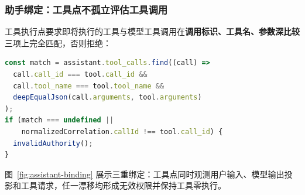 \subsubsection{助手绑定：工具点不孤立评估工具调用}

工具执行点要求即将执行的工具与模型工具调用在\textbf{调用标识、工具名、参数深比较}三项上完全匹配，否则拒绝：

\begin{lstlisting}[language=TypeScript, caption={助手绑定校验（\texttt{authority-builder.ts}）}]
const match = assistant.tool_calls.find((call) =>
  call.call_id === tool.call_id &&
  call.tool_name === tool.tool_name &&
  deepEqualJson(call.arguments, tool.arguments)
);
if (match === undefined ||
    normalizedCorrelation.callId !== tool.call_id) {
  invalidAuthority();
}
\end{lstlisting}

图~\ref{fig:assistant-binding} 展示三重绑定：工具点同时观测用户输入、模型输出投影和工具请求，任一漂移均形成无效权限并保持工具零执行。


